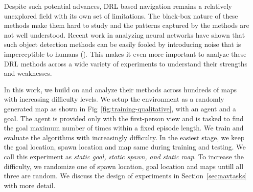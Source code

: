 Despite such potential advances, DRL based navigation remains a relatively unexplored field with its own set of limitations. 
The black-box nature of these methods make them hard to study and the patterns captured by the methods are not well understood. 
Recent work in analyzing neural networks have shown that such object detection methods can be easily fooled by introducing noise that is imperceptible to humans (\cite{NgYoClCVPR2015}). 
This makes it even more important to analyze these DRL methods across a wide variety of experiments to understand their strengths and weaknesses.


In this work, we build on \cite{MiPaViICLR2017} and analyze their methods across hundreds of maps with increasing difficulty levels. 
We setup the environment as a randomly generated map as shown in Fig~\ref{fig:training-qualitative}, with an agent and a goal.
The agent is provided only with the first-person view and is tasked to find the goal maximum number of times within a fixed episode length.
We train and evaluate the algorithms with increasingly difficulty.
In the easiest stage, we keep the goal location, spawn location and map same during training and testing.
We call this experiment as \emph{static goal, static spawn, and static map}.
To increase the difficulty, we randomize one of spawn location, goal location and maps untill all three are random.
We discuss the design of experiments in Section~\ref{sec:navtasks} with more detail.

